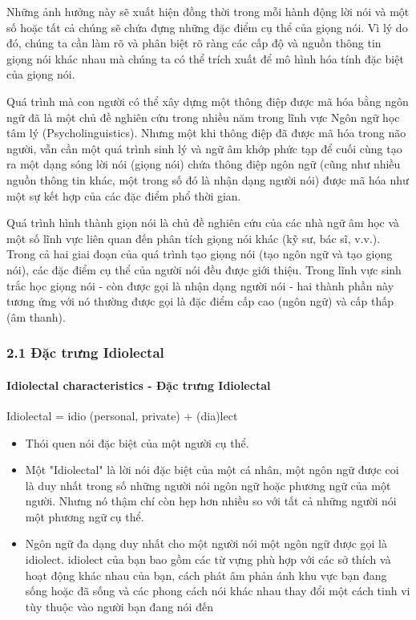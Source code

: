 \documentclass{article}
\begin{document}
	Những ảnh hưởng này sẽ xuất hiện đồng thời trong mỗi hành động lời nói và một số hoặc tất cả chúng sẽ chứa đựng những đặc điểm cụ thể của giọng nói. Vì lý do đó, chúng ta cần làm rõ và phân biệt rõ ràng các cấp độ và nguồn thông tin giọng nói khác nhau mà chúng ta có thể trích xuất để mô hình hóa tính đặc biệt của giọng nói.
	
	Quá trình mà con người có thể xây dựng một thông điệp được mã hóa bằng ngôn ngữ đã là một chủ đề nghiên cứu trong nhiều năm trong lĩnh vực Ngôn ngữ học tâm lý (Psycholinguistics). Nhưng một khi thông điệp đã được mã hóa trong não người, vẫn cần một quá trình sinh lý và ngữ âm khớp phức tạp để cuối cùng tạo ra một dạng sóng lời nói (giọng nói) chứa thông điệp ngôn ngữ (cũng như nhiều nguồn thông tin khác, một trong số đó là nhận dạng người nói) được mã hóa như một sự kết hợp của các đặc điểm phổ thời gian. 
	
	Quá trình hình thành giọn nói là chủ đề nghiên cứu của các nhà ngữ âm học và một số lĩnh vực liên quan đến phân tích giọng nói khác (kỹ sư, bác sĩ, v.v.). Trong cả hai giai đoạn của quá trình tạo giọng nói (tạo ngôn ngữ và tạo giọng nói), các đặc điểm cụ thể của người nói đều được giới thiệu. Trong lĩnh vực sinh trắc học giọng nói - còn được gọi là nhận dạng người nói - hai thành phần này tương ứng với nó thường được gọi là đặc điểm cấp cao (ngôn ngữ) và cấp thấp (âm thanh).
	
	\subsubsection{2.1 Đặc trưng Idiolectal}
	\paragraph{Idiolectal characteristics - Đặc trưng Idiolectal}
	Idiolectal = idio (personal, private) + (dia)lect
	\begin{itemize}
		\item Thói quen nói đặc biệt của một người cụ thể.
		\item Một "Idiolectal" là lời nói đặc biệt của một cá nhân, một ngôn ngữ được coi là duy nhất trong số những người nói ngôn ngữ hoặc phương ngữ của một người. Nhưng nó thậm chí còn hẹp hơn nhiều so với tất cả những người nói một phương ngữ cụ thể.
		\item Ngôn ngữ đa dạng duy nhất cho một người nói một ngôn ngữ được gọi là idiolect. idiolect của bạn bao gồm các từ vựng phù hợp với các sở thích và hoạt động khác nhau của bạn, cách phát âm phản ánh khu vực bạn đang sống hoặc đã sống và các phong cách nói khác nhau thay đổi một cách tinh vi tùy thuộc vào người bạn đang nói đến
	\end{itemize}
	
\end{document}
